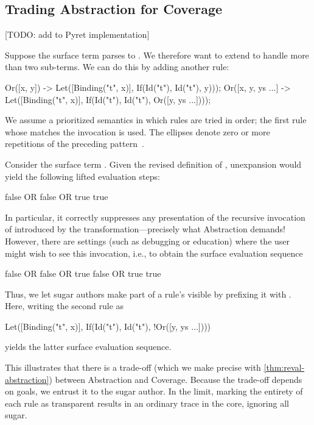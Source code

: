 \subsection{Trading Abstraction for Coverage}
\label{sec:reval-trading}

[TODO: add to Pyret implementation]

Suppose the surface term  parses to
. We therefore want to extend 
to handle more than two sub-terms.  We can do this by adding another
rule:
\begin{Codes}
Or([x, y]) ->
  Let([Binding("t", x)],
      If(Id("t"), Id("t"), y)));
Or([x, y, ys ...] ->
  Let([Binding("t", x)],
      If(Id("t"), Id("t"), Or([y, ys ...])));
\end{Codes}
We assume a prioritized semantics in which rules are tried in
order; the first rule whose  matches the invocation is
used. The ellipses denote zero or more repetitions
of the preceding pattern~\cite{macro-by-example}.

Consider the surface term . 
Given the revised definition of , unexpansion would yield the
following lifted evaluation steps:
\begin{Codes}
    false OR false OR true
\SurfStep true
\end{Codes}
In particular, it correctly suppresses any presentation of the recursive
invocation of 
introduced by the transformation---precisely what Abstraction demands!
However, there are settings
(such as debugging or education) where the user might wish to see this
invocation, i.e., to obtain the surface evaluation sequence
\begin{Codes}
    false OR false OR true
\SurfStep false OR true
\SurfStep true
\end{Codes}
Thus, we let sugar authors make part of a rule's 
visible by prefixing it with \Code{!}. Here, writing the second
 rule as
\begin{Codes}
Let([Binding("t", x)],
    If(Id("t"), Id("t"), !Or([y, ys ...])))
\end{Codes}
yields the latter surface evaluation sequence.

This illustrates that there is a trade-off (which we make precise with
\cref{thm:reval-abstraction}) between Abstraction and Coverage.
Because the trade-off depends on
goals, we entrust it to the sugar author.  In the limit,
marking the entirety of each rule as transparent results in
an ordinary trace in the core, ignoring all sugar.


